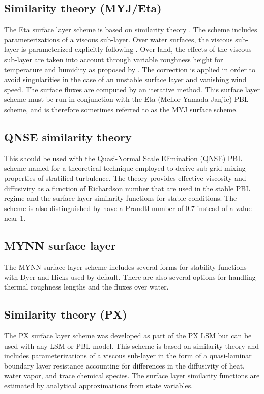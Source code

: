 \subsection{Similarity theory (MYJ/Eta)}

The Eta surface layer scheme \citep{janjic96,janjic02} is based 
on similarity theory \citep{monin54}. The scheme 
includes parameterizations of a viscous sub-layer. Over water surfaces, the 
viscous sub-layer is parameterized explicitly following \citet{janjic94}. 
Over land, the effects of the viscous sub-layer are taken into account 
through variable roughness height for temperature and humidity as proposed by 
\citet{zilit95}. The \citet{beljaars94} correction is applied in order 
to avoid singularities in the case of an unstable surface layer and vanishing 
wind speed. The surface fluxes are computed by an iterative method. 
This surface layer scheme must be run in conjunction with the Eta
(Mellor-Yamada-Janjic) PBL scheme, and is therefore sometimes referred to
as the MYJ surface scheme.

\subsection{QNSE similarity theory}

This should be used with the Quasi-Normal Scale Elimination (QNSE) PBL scheme
\citep{sukoriansky05} named for a theoretical technique employed to derive sub-grid
mixing properties of stratified turbulence. The theory provides effective viscosity and
diffusivity as a function of Richardson number that are used in the stable PBL regime
and the surface layer similarity functions for stable conditions. The scheme is also
distinguished by have a Prandtl number of 0.7 instead of a value near 1. 

\subsection{MYNN surface layer}

The MYNN surface-layer scheme includes  several forms for stability functions with Dyer and Hicks
used by default. There are also several options for handling thermal roughness lengths and the 
fluxes over water.

\subsection{Similarity theory (PX)}

The PX surface layer scheme \citep{pleim06} was developed as part of the PX LSM but can be used with any LSM or PBL model.  This scheme is based on similarity theory and includes parameterizations of a viscous sub-layer in the form of a quasi-laminar boundary layer resistance accounting for differences in the diffusivity of heat, water vapor, and trace chemical species.   The surface layer similarity functions are estimated by analytical approximations from state variables.  

